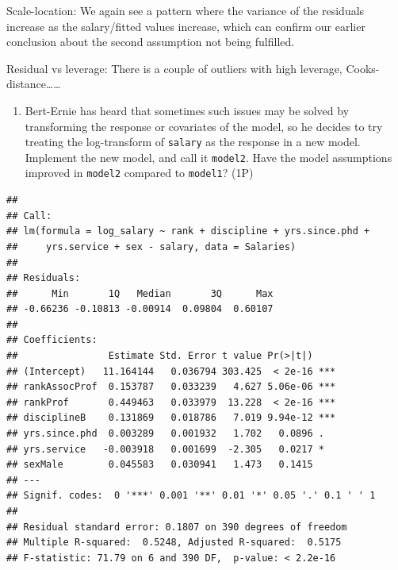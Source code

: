 \documentclass[
]{article}
\newenvironment{Shaded}{\begin{snugshade}}{\end{snugshade}}
\newcommand{\AttributeTok}[1]{\textcolor[rgb]{0.77,0.63,0.00}{#1}}
\newcommand{\CommentTok}[1]{\textcolor[rgb]{0.56,0.35,0.01}{\textit{#1}}}
\newcommand{\FunctionTok}[1]{\textcolor[rgb]{0.00,0.00,0.00}{#1}}
\newcommand{\NormalTok}[1]{#1}
\newcommand{\OtherTok}[1]{\textcolor[rgb]{0.56,0.35,0.01}{#1}}
\newcommand{\SpecialCharTok}[1]{\textcolor[rgb]{0.00,0.00,0.00}{#1}}
\providecommand{\tightlist}{%
  \setlength{\itemsep}{0pt}\setlength{\parskip}{0pt}}
\begin{document}
Scale-location: We again see a pattern where the variance of the
residuals increase as the salary/fitted values increase, which can
confirm our earlier conclusion about the second assumption not being
fulfilled.

Residual vs leverage: There is a couple of outliers with high leverage,
Cooks-distance\ldots\ldots{}

\begin{enumerate}
\def\labelenumi{\roman{enumi})}
\setcounter{enumi}{1}
\tightlist
\item
  Bert-Ernie has heard that sometimes such issues may be solved by
  transforming the response or covariates of the model, so he decides to
  try treating the log-transform of \texttt{salary} as the response in a
  new model. Implement the new model, and call it \texttt{model2}. Have
  the model assumptions improved in \texttt{model2} compared to
  \texttt{model1}? (1P)
\end{enumerate}

\begin{Shaded}
\end{Shaded}

\begin{verbatim}
## 
## Call:
## lm(formula = log_salary ~ rank + discipline + yrs.since.phd + 
##     yrs.service + sex - salary, data = Salaries)
## 
## Residuals:
##      Min       1Q   Median       3Q      Max 
## -0.66236 -0.10813 -0.00914  0.09804  0.60107 
## 
## Coefficients:
##                Estimate Std. Error t value Pr(>|t|)    
## (Intercept)   11.164144   0.036794 303.425  < 2e-16 ***
## rankAssocProf  0.153787   0.033239   4.627 5.06e-06 ***
## rankProf       0.449463   0.033979  13.228  < 2e-16 ***
## disciplineB    0.131869   0.018786   7.019 9.94e-12 ***
## yrs.since.phd  0.003289   0.001932   1.702   0.0896 .  
## yrs.service   -0.003918   0.001699  -2.305   0.0217 *  
## sexMale        0.045583   0.030941   1.473   0.1415    
## ---
## Signif. codes:  0 '***' 0.001 '**' 0.01 '*' 0.05 '.' 0.1 ' ' 1
## 
## Residual standard error: 0.1807 on 390 degrees of freedom
## Multiple R-squared:  0.5248, Adjusted R-squared:  0.5175 
## F-statistic: 71.79 on 6 and 390 DF,  p-value: < 2.2e-16
\end{verbatim}
\end{document}
